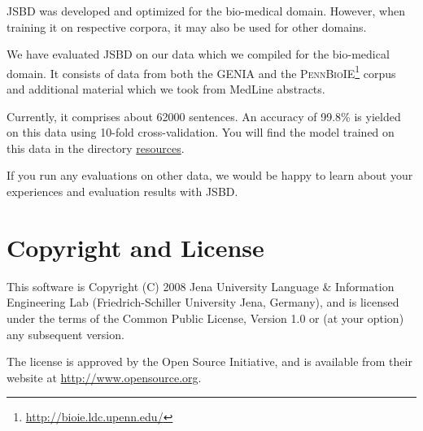 \documentclass[11pt,a4paper,halfparskip]{scrartcl}
\begin{document}
JSBD was developed and optimized for the bio-medical domain. However,
when training it on respective corpora, it may also be used for other
domains.

We have evaluated JSBD on our data which we compiled for the
bio-medical domain. It consists of data from both the GENIA
\cite{ohta02} and the
\textsc{PennBioIE}\footnote{\url{http://bioie.ldc.upenn.edu/}} corpus
and additional material which we took from MedLine abstracts.

Currently, it comprises about 62000 sentences. An accuracy of 99.8\% is
yielded on this data using 10-fold cross-validation.  You will find
the model trained on this data in the directory \url{resources}.

If you run any evaluations on other data, we would be happy to learn
about your experiences and evaluation results with JSBD.





\section{Copyright and License}
This software is Copyright (C) 2008 Jena University Language \& Information
Engineering Lab (Friedrich-Schiller University Jena, Germany), and is
licensed under the terms of the Common Public License, Version 1.0 or (at
your option) any subsequent version.

The license is approved by the Open Source Initiative, and is
available from their website at \url{http://www.opensource.org}.



\end{document}
